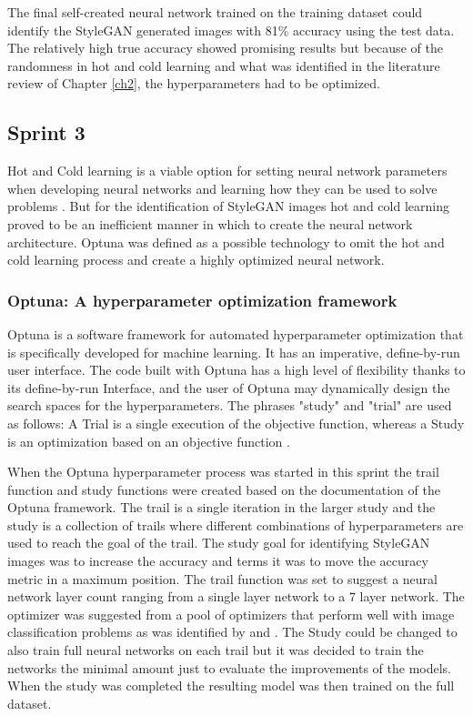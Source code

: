 The final self-created neural network trained on the training dataset could identify the StyleGAN generated images with 81\% accuracy using the test data. The relatively high true accuracy showed promising results but because of the randomness in hot and cold learning and what was identified in the literature review of Chapter \ref{ch2}, the hyperparameters had to be optimized.


\subsection{Sprint 3}

Hot and Cold learning is a viable option for setting neural network parameters when developing neural networks and learning how they can be used to solve problems \citep{Trask2019}. But for the identification of StyleGAN images hot and cold learning proved to be an inefficient manner in which to create the neural network architecture. Optuna was defined as a possible technology to omit the hot and cold learning process and create a highly optimized neural network.  

\subsubsection{Optuna: A hyperparameter optimization framework}

Optuna is a software framework for automated hyperparameter optimization that is specifically developed for machine learning. It has an imperative, define-by-run user interface. The code built with Optuna has a high level of flexibility thanks to its define-by-run Interface, and the user of Optuna may dynamically design the search spaces for the hyperparameters. The phrases "study" and "trial" are used as follows: A Trial is a single execution of the objective function, whereas a Study is an optimization based on an objective function \citep{optuna2019}.

When the Optuna hyperparameter process was started in this sprint the trail function and study functions were created based on the documentation of the Optuna framework. The trail is a single iteration in the larger study and the study is a collection of trails where different combinations of hyperparameters are used to reach the goal of the trail. The study goal for identifying StyleGAN images was to increase the accuracy and \cite{optuna2019} terms it was to move the accuracy metric in a maximum position. The trail function was set to suggest a neural network layer count ranging from a single layer network to a 7 layer network. The optimizer was suggested from a pool of optimizers that perform well with image classification problems as was identified by \cite{bera2020analysis} and \cite{kandel2020comparative}. The Study could be changed to also train full neural networks on each trail but it was decided to train the networks the minimal amount just to evaluate the improvements of the models. When the study was completed the resulting model was then trained on the full dataset.

